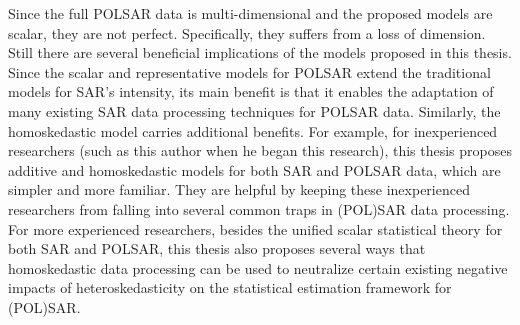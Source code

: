 \begin{abstracts}
Since the full POLSAR data is multi-dimensional and the proposed models are scalar, they are not perfect.
Specifically, they suffers from a loss of dimension.
Still there are several beneficial implications of the models proposed in this thesis. 
Since the scalar and representative models for POLSAR extend the traditional models for SAR's intensity,
  its main benefit is that it enables the adaptation of many existing SAR data processing techniques for POLSAR data.
Similarly, the homoskedastic model carries additional benefits.
For example, for inexperienced researchers (such as this author when he began this research),
  this thesis proposes additive and homoskedastic models for both SAR and POLSAR data,
  which are simpler and more familiar.
They are helpful by keeping these inexperienced researchers from falling into several common traps in (POL)SAR data processing.
For more experienced researchers, besides the unified scalar statistical theory for both SAR and POLSAR, 
  this thesis also proposes several ways that homoskedastic data processing can be used to neutralize certain existing negative impacts of heteroskedasticity on the statistical estimation framework for (POL)SAR.


\end{abstracts}
